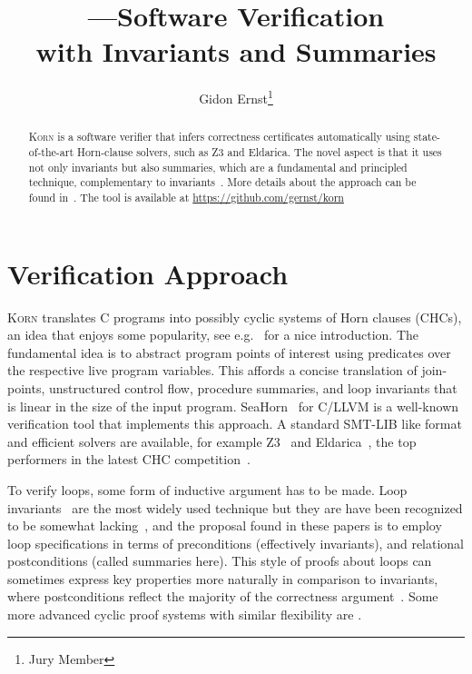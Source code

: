 \documentclass{llncs}
\author{Gidon Ernst\thanks{Jury Member}}
\title{\Korn---Software Verification \\ with Invariants and Summaries}
\institute{LMU Munich \\ \mailto{gidon.ernst@lmu.de}}
\newcommand{\Korn}{\textsc{Korn}\xspace}
\begin{document}
\maketitle

\begin{abstract}
    \Korn is a software verifier that infers correctness certificates automatically using state-of-the-art Horn-clause solvers, such as Z3 and Eldarica.
    The novel aspect is that it uses not only invariants but also summaries, which are a fundamental and principled technique, complementary to invariants~\cite{hehner1999refinement,hehner2005specified,tuerk2010local}.
    More details about the approach can be found in~\cite{ernst:arxiv2020:summaries}.
    The tool is available at \url{https://github.com/gernst/korn}

\end{abstract}

\section{Verification Approach}
\label{sec:approach}

\Korn translates C programs into possibly cyclic systems of Horn clauses (CHCs),
an idea that enjoys some popularity, see e.g.~\cite{bjorner2015horn} for a nice introduction.
The fundamental idea is to abstract program points of interest using predicates over the respective live program variables.
This affords a concise translation of join-points, unstructured control flow, procedure summaries, and loop invariants
that is linear in the size of the input program.
SeaHorn~\cite{gurfinkel2019science} for C/LLVM is a well-known verification tool that implements this approach.
A standard SMT-LIB like format and efficient solvers are available,
for example Z3~\cite{bjorner2013solving} and Eldarica~\cite{hojjat2018eldarica},
the top performers in the latest CHC competition~\cite{rummer2020competition}.

To verify loops, some form of inductive argument has to be made.
Loop invariants~\cite{hoare1969axiomatic} are the most widely used technique
but they are have been recognized to be somewhat lacking~\cite{hehner1999refinement,tuerk2010local,hehner2005specified},
and the proposal found in these papers is to employ loop specifications in terms of preconditions (effectively invariants),
and relational postconditions (called summaries here).
This style of proofs about loops can sometimes express key properties more naturally in comparison to invariants,
where postconditions reflect the majority of the correctness argument~\cite{tuerk2010local,ernst:sttt2015,jacobs2015solving}.
Some more advanced cyclic proof systems with similar flexibility are \cite{schellhorn2014rgitl,rosu2009circular,brotherston2005cyclic}.
\end{document}
